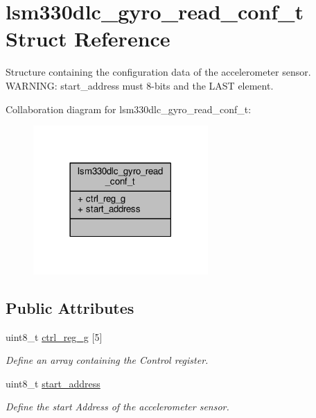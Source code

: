 \hypertarget{structlsm330dlc__gyro__read__conf__t}{\section{lsm330dlc\+\_\+gyro\+\_\+read\+\_\+conf\+\_\+t Struct Reference}
\label{structlsm330dlc__gyro__read__conf__t}
}


Structure containing the configuration data of the accelerometer sensor. W\+A\+R\+N\+I\+N\+G\+: start\+\_\+address must 8-\/bits and the L\+A\+S\+T element.  




Collaboration diagram for lsm330dlc\+\_\+gyro\+\_\+read\+\_\+conf\+\_\+t\+:
\nopagebreak
\begin{figure}[H]
\begin{center}
\leavevmode
\includegraphics[width=189pt]{structlsm330dlc__gyro__read__conf__t__coll__graph}
\end{center}
\end{figure}
\subsection*{Public Attributes}
\begin{DoxyCompactItemize}
\item 
\hypertarget{structlsm330dlc__gyro__read__conf__t_a3b38cc4aabcac65f2e1c714a00274a35}{uint8\+\_\+t \hyperlink{structlsm330dlc__gyro__read__conf__t_a3b38cc4aabcac65f2e1c714a00274a35}{ctrl\+\_\+reg\+\_\+g} \mbox{[}5\mbox{]}}\label{structlsm330dlc__gyro__read__conf__t_a3b38cc4aabcac65f2e1c714a00274a35}

\begin{DoxyCompactList}\small\item\em Define an array containing the Control register. \end{DoxyCompactList}\item 
\hypertarget{structlsm330dlc__gyro__read__conf__t_aaec4ea2a42523a3a39c639cbdb889fa6}{uint8\+\_\+t \hyperlink{structlsm330dlc__gyro__read__conf__t_aaec4ea2a42523a3a39c639cbdb889fa6}{start\+\_\+address}}\label{structlsm330dlc__gyro__read__conf__t_aaec4ea2a42523a3a39c639cbdb889fa6}

\begin{DoxyCompactList}\small\item\em Define the start Address of the accelerometer sensor. \end{DoxyCompactList}\end{DoxyCompactItemize}


